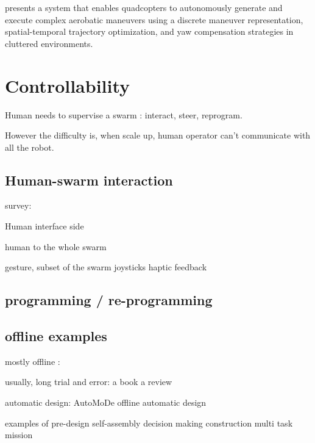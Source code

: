 \cite{wang2025unlocking} presents a system that enables quadcopters to autonomously generate and execute complex aerobatic maneuvers using a discrete maneuver representation, spatial-temporal trajectory optimization, and yaw compensation strategies in cluttered environments.


\section{Controllability}

Human needs to supervise a swarm : interact, steer, reprogram.

However the difficulty is, when scale up, human operator can't communicate with all the robot.

\subsection{Human-swarm interaction}

survey:
\cite{siean2023opportunities}
\cite{kolling2015human}

Human interface side
\cite{jarvis2025first}
\cite{abioye2025user}
\cite{alonso2015gesture}

human to the whole swarm
\cite{ayanian2014controlling}
\cite{alonso2015gesture}
\cite{macchini2021personalized}

\cite{podevijn2013gesturing} gesture, subset of the swarm
\cite{zhou2016assistive} joysticks
\cite{lee2013semiautonomous} haptic feedback

\cite{kolling2013human}

\subsection{programming / re-programming}

\subsection {offline examples}

mostly offline :

usually, long trial and error: 
\cite{hamann2018swarm} a book
\cite{brambilla2013swarm} a review

automatic design:
\cite{francesca2014automode} AutoMoDe
\cite{francesca2016automatic}
\cite{birattari2019automatic} offline automatic design

examples of pre-design
\cite{rubenstein2014programmable} self-assembly
\cite{valentini2016collective} decision making
\cite{werfel2014designing} construction
\cite{dorigo2013swarmanoid} multi task mission

